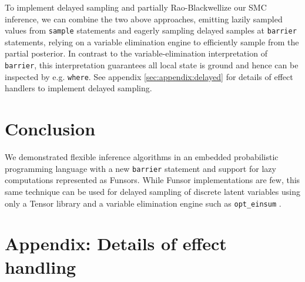 \documentclass[anonymous=false, %
               format=acmsmall, %
               review=true, %
               screen=true, %
               nonacm=true]{acmart}
\begin{document}
To implement delayed sampling and partially Rao-Blackwellize our SMC inference, we can combine the two above approaches, emitting lazily sampled values from \verb$sample$ statements and eagerly sampling delayed samples at \verb$barrier$ statements, relying on a variable elimination engine to efficiently sample from the partial posterior.
In contrast to the variable-elimination interpretation of \verb$barrier$, this interpretation guarantees all local state is ground and hence can be inspected by e.g. \verb$where$.
See appendix \ref{sec:appendix:delayed} for details of effect handlers to implement delayed sampling.

\section{Conclusion}

We demonstrated flexible inference algorithms in an embedded probabilistic programming language with a new \verb$barrier$ statement and support for lazy computations represented as Funsors.
While Funsor implementations are few, this same technique can be used for delayed sampling of discrete latent variables using only a Tensor library and a variable elimination engine such as \verb$opt_einsum$ \cite{smith2018opt_einsum}.





\section{Appendix: Details of effect handling}
\end{document}
